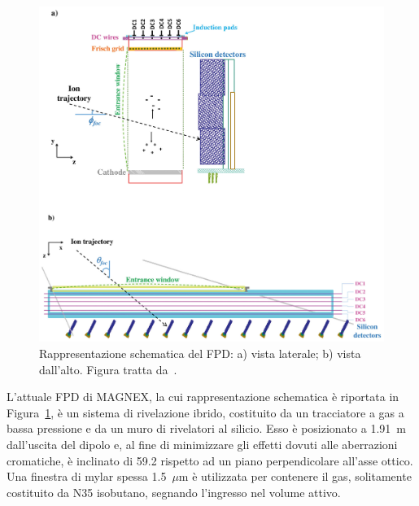 \begin{figure} [!p]
	\centering
	\includegraphics[width=\textwidth, keepaspectratio]{Grafici/fpd.png}
	\caption{Rappresentazione schematica del FPD: a) vista laterale; b) vista dall'alto. Figura tratta da~\cite{cappuzzello:epja18}.} \label{fig:fpd}
\end{figure}

L'attuale FPD di MAGNEX, la cui rappresentazione schematica è riportata in Figura~\ref{fig:fpd}, è un sistema di rivelazione ibrido, costituito da un tracciatore a gas a bassa pressione e da un muro di rivelatori al silicio.
Esso è posizionato a 1.91~m dall'uscita del dipolo e, al fine di minimizzare gli effetti dovuti alle aberrazioni cromatiche\cite{cunsolo:nima01}, è inclinato di 59.2\textdegree{} rispetto ad un piano perpendicolare all'asse ottico.
Una finestra di mylar spessa 1.5~$\mu$m è utilizzata per contenere il gas, solitamente costituito da N35 isobutano, segnando l'ingresso nel volume attivo.





